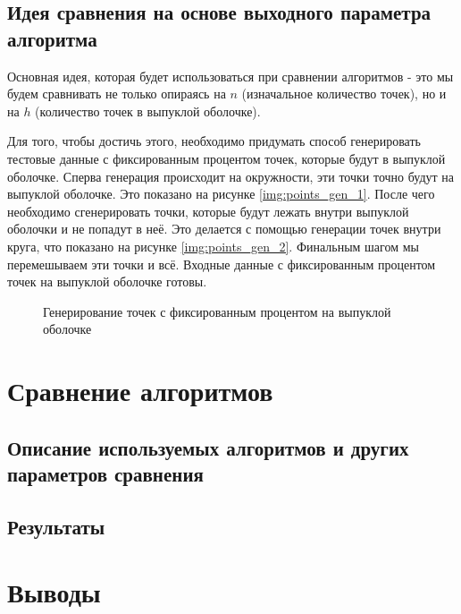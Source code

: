 \subsection{Идея сравнения на основе выходного параметра алгоритма}

Основная идея, которая будет использоваться при сравнении алгоритмов - это мы будем сравнивать не только опираясь на $n$ (изначальное количество точек), но и на $h$ (количество точек в выпуклой оболочке).

Для того, чтобы достичь этого, необходимо придумать способ генерировать тестовые данные с фиксированным процентом точек, которые будут в выпуклой оболочке. Сперва генерация происходит на окружности, эти точки точно будут на выпуклой оболочке. Это показано на рисунке \ref{img:points_gen_1}. После чего необходимо сгенерировать точки, которые будут лежать внутри выпуклой оболочки и не попадут в неё. Это делается с помощью генерации точек внутри круга, что показано на рисунке \ref{img:points_gen_2}. Финальным шагом мы перемешываем эти точки и всё. Входные данные с фиксированным процентом точек на выпуклой оболочке готовы.

\begin{figure}[H]
	{\centering
		\hfill
		\subbottom[\label{img:points_gen_1}]{%
			}
		\hfill
		\subbottom[\label{img:points_gen_2}]{%
			}
		\hfill
	}
	\caption{Генерирование точек с фиксированным процентом на выпуклой оболочке}
	\label{img:points_gen}
\end{figure}

\section{Сравнение алгоритмов}

\subsection{Описание используемых алгоритмов и других параметров сравнения}

\subsection{Результаты}

\section{Выводы}

